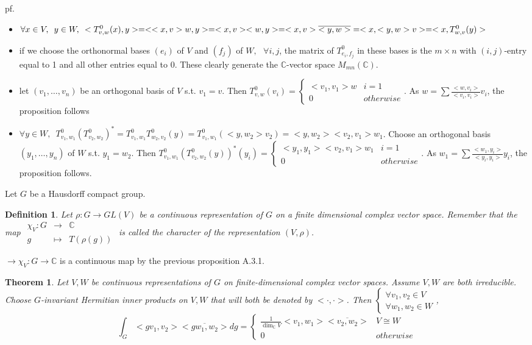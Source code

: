 \documentclass[12pt,letterpaper]{report}
\newtheorem{definition}{Definition}[section]
\newtheorem{theorem}{Theorem}[section]
\begin{document}
pf.\begin{itemize}\item $\forall x\in V,\,\,\,y\in W,\,\,\,<T_{v,w}^{0}(x),y>=<<x,v>w,y>=<x,v><w,y>=<x,v>\overline{<y,w>}\\=<x,<y,w>v>=<x,T_{w,v}^{0}(y)>$
\item if we choose the orthonormal bases $(e_{i})$ of $V$ and $(f_{j})$ of $W,\,\,\,\,\forall i,j$, the matrix of $T_{e_{i},f_{j}}^{0}$ in these bases is the $m\times n$ with $(i,j)$-entry equal to 1 and all other entries equal to 0. These clearly generate the $\mathbb{C}$-vector space $M_{mn}(\mathbb{C})$. 
\item let $(v_{1},\dots,v_{n})$ be an orthogonal basis of $V$ s.t. $v_{1}=v$. Then $T_{v,w}^{0}(v_{i})=\left\{\begin{array}{rr}<v_{1},v_{1}>w&i=1\\0&otherwise\end{array}\right.$. As $w=\sum \frac{<w,v_{i}>}{<v_{i},v_{i}>}v_{i}$, the proposition follows
\item $\forall y\in W,\,\,\,T_{v_{1},w_{1}}^{0}(T_{v_{2},w_{2}}^{0})^{*}=T_{v_{1},w_{1}}^{0}T_{w_{2},v_{2}}^{0}(y)=T_{v_{1},w_{1}}^{0}(<y,w_{2}>v_{2})=<y,w_{2}><v_{2},v_{1}>w_{1}$. Choose an orthogonal basis $(y_{1},\dots,y_{n})$ of $W$ s.t. $y_{1}=w_{2}$. Then $T_{v_{1},w_{1}}^{0}(T_{v_{2},w_{2}}^{0}(y))^{*}(y_{i})=\left\{\begin{array}{rr}<y_{1},y_{1}><v_{2},v_{1}>w_{1}&i=1\\0&otherwise\end{array}\right.$. As $w_{1}=\sum\frac{<w_{1},y_{i}>}{<y_{i},y_{i}>}y_{i}$, the proposition follows.
\end{itemize}
Let $G$ be a Hausdorff compact group. 
\begin{definition}Let $\rho:G\rightarrow GL(V)$ be a continuous representation of $G$ on a finite dimensional complex vector space. Remember that the map $\begin{array}{rrr}\chi_{V}:G&\rightarrow&\mathbb{C}\\g&\mapsto&T(\rho(g))\end{array}$ is called the character of the representation $(V,\rho)$.\end{definition}
$\rightarrow \chi_{V}:G\rightarrow\mathbb{C}$ is a continuous map by the previous proposition A.3.1.
\begin{theorem}Let $V,W$ be continuous representations of $G$ on finite-dimensional complex vector spaces. Assume $V,W$ are both irreducible. Choose $G$-invariant Hermitian inner products on $V,W$ that will both be denoted by $<\cdot,\cdot>$. Then $\left\{\begin{array}{r}\forall v_{1},v_{2}\in V\\\forall w_{1},w_{2}\in W\end{array}\right.$, \begin{equation*}\int_{G}<gv_{1},v_{2}>\overline{<gw_{1},w_{2}>}dg=\left\{\begin{array}{rr}\frac{1}{\dim_{\mathbb{C}}V}<v_{1},w_{1}>\overline{<v_{2},w_{2}>}&V\cong W\\0&otherwise\end{array}\right.\end{equation*}\end{theorem}
\end{document}
